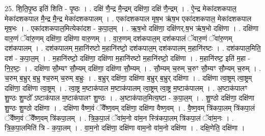 \documentclass[17pt]{extarticle}
\begin{document}
25. शि॒ति॒पृ॒ष्ठ इति॑ शिति - पृ॒ष्ठः । . दक्षि॑ णै॒न्द्र मै॒न्द्रम् दक्षि॑णा॒ दक्षि॑ णै॒न्द्रम् । . ऐ॒न्द्र मेका॑दशकपाल॒ मेका॑दशकपाल मै॒न्द्र मै॒न्द्र मेका॑दशकपालम् । . एका॑दशकपाल मृष॒भ ऋ॑ष॒भ एका॑दशकपाल॒ मेका॑दशकपाल मृष॒भः । . एका॑दशकपाल॒मित्येका॑दश - क॒पा॒ल॒म् । . ऋ॒ष॒भो दक्षि॑णा॒ दक्षि॑णर्.ष॒भ ऋ॑ष॒भो दक्षि॑णा । . दक्षि॑णा वारु॒णं ॅवा॑रु॒णम् दक्षि॑णा॒ दक्षि॑णा वारु॒णम् । . वा॒रु॒णम् दश॑कपाल॒म् दश॑कपालं ॅवारु॒णं ॅवा॑रु॒णम् दश॑कपालम् । . दश॑कपालम् म॒हानि॑रष्टो म॒हानि॑रष्टो॒ दश॑कपाल॒म् दश॑कपालम् म॒हानि॑रष्टः । . दश॑कपाल॒मिति॒ दश॑ - क॒पा॒ल॒म् । . म॒हानि॑रष्टो॒ दक्षि॑णा॒ दक्षि॑णा म॒हानि॑रष्टो म॒हानि॑रष्टो॒ दक्षि॑णा । . म॒हानि॑रष्ट॒ इति॑ म॒हा - नि॒र॒ष्टः॒ । . दक्षि॑णा सौ॒म्यꣳ सौ॒म्यम् दक्षि॑णा॒ दक्षि॑णा सौ॒म्यम् । . सौ॒म्यम् च॒रुम् च॒रुꣳ सौ॒म्यꣳ सौ॒म्यम् च॒रुम् । . च॒रुम् ब॒भ्रुर् ब॒भ्रु श्च॒रुम् च॒रुम् ब॒भ्रुः । . ब॒भ्रुर् दक्षि॑णा॒ दक्षि॑णा ब॒भ्रुर् ब॒भ्रुर् दक्षि॑णा । . दक्षि॑णा त्वा॒ष्ट्रम् त्वा॒ष्ट्रम् दक्षि॑णा॒ दक्षि॑णा त्वा॒ष्ट्रम् । . त्वा॒ष्ट्र म॒ष्टाक॑पाल म॒ष्टाक॑पालम् त्वा॒ष्ट्रम् त्वा॒ष्ट्र म॒ष्टाक॑पालम् । . अ॒ष्टाक॑पालꣳ शु॒ण्ठः शु॒ण्ठो᳚ ऽष्टाक॑पाल म॒ष्टाक॑पालꣳ शु॒ण्ठः । . अ॒ष्टाक॑पाल॒मित्य॒ष्टा - क॒पा॒ल॒म् । . शु॒ण्ठो दक्षि॑णा॒ दक्षि॑णा शु॒ण्ठः शु॒ण्ठो दक्षि॑णा । . दक्षि॑णा वैष्ण॒वं ॅवै᳚ष्ण॒वम् दक्षि॑णा॒ दक्षि॑णा वैष्ण॒वम् । . वै॒ष्ण॒वम् त्रि॑कपा॒लम् त्रि॑कपा॒लं ॅवै᳚ष्ण॒वं ॅवै᳚ष्ण॒वम् त्रि॑कपा॒लम् । . त्रि॒क॒पा॒लं ॅवा॑म॒नो वा॑म॒न स्त्रि॑कपा॒लम् त्रि॑कपा॒लं ॅवा॑म॒नः । . त्रि॒क॒पा॒लमिति॑ त्रि - क॒पा॒लम् । . वा॒म॒नो दक्षि॑णा॒ दक्षि॑णा वाम॒नो वा॑म॒नो दक्षि॑णा । . दक्षि॒णेति॒ दक्षि॑णा । \newline
\end{document}
